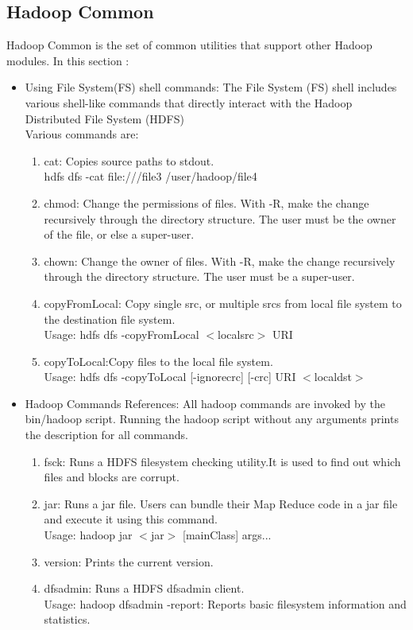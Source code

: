 \documentclass[12pt]{book}
\begin{document}
\subsection{Hadoop Common}
Hadoop Common is the set of common utilities that support other Hadoop modules.
In this section :
\begin{itemize}
 \item Using File System(FS) shell commands: The File System (FS) shell includes various shell-like commands that directly interact with the Hadoop Distributed File System (HDFS)\\
 Various commands are:
 \begin{enumerate}
   \item cat: Copies source paths to stdout.\\
   \hspace{40mm} hdfs dfs -cat file:///file3 /user/hadoop/file4
   \item chmod: Change the permissions of files. With -R, make the change recursively through the directory structure. The user must be the owner of the file, or else a super-user.
   \item chown: Change the owner of files. With -R, make the change recursively through the directory structure. The user must be a super-user.
   \item copyFromLocal: Copy single src, or multiple srcs from local file system to the destination file system.\\
   Usage: hdfs dfs -copyFromLocal $<$localsrc$>$ URI
   \item copyToLocal:Copy files to the local file system.\\
   Usage: hdfs dfs -copyToLocal [-ignorecrc] [-crc] URI $<$localdst$>$
   \end{enumerate}

 \item Hadoop Commands References: All hadoop commands are invoked by the bin/hadoop script. Running the hadoop script without any arguments prints the description for all commands.
   \begin{enumerate}
   \item fsck: Runs a HDFS filesystem checking utility.It is used to find out which files and blocks are corrupt.
   \item jar: Runs a jar file. Users can bundle their Map Reduce code in a jar file and execute it using this command.\\
   Usage: hadoop jar $<$jar$>$ [mainClass] args...
   \item version: Prints the current version.
   \item dfsadmin: Runs a HDFS dfsadmin client.\\
   Usage: hadoop dfsadmin -report: Reports basic filesystem information and statistics.
  
  
   \end{enumerate}
\end{itemize}
\end{document}
